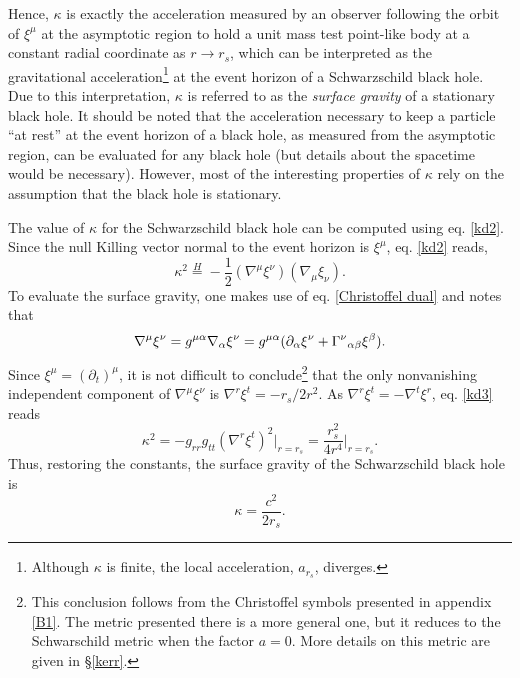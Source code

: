 \documentclass[
12pt,		%
openright,	%
twoside,  %
a4paper,			%
chapter=TITLE,		%
english,			%
french,				%
spanish,			%
brazil				%
]{USPSC-classe/USPSC}
\begin{document}
Hence, $\kappa$ is exactly the acceleration measured by an observer following the orbit of $\xi^{\mu}$ at the asymptotic region to hold a unit mass test point-like body at a constant radial coordinate as $r\to r_s$, which can be interpreted as the gravitational acceleration\footnote{Although $\kappa$ is finite, the local acceleration, $a_{r_s}$, diverges.} at the event horizon of a Schwarzschild black hole. Due to this interpretation, $\kappa$ is referred to as the \textit{surface gravity} of a stationary black hole. It should be noted that the acceleration necessary to keep a particle “at rest” at the event horizon of a black hole, as measured from the asymptotic region, can be evaluated for any black hole (but details about the spacetime would be necessary). However, most of the interesting properties of $\kappa$ rely on the assumption that the black hole is stationary. 

The value of $\kappa$ for the Schwarzschild black hole can be computed using eq. \ref{kd2}. Since the null Killing vector normal to the event horizon is $\xi^{\mu}$, eq. \ref{kd2} reads,
\begin{equation}\label{kd3}
    \kappa^2\overset{H}{=}-\frac{1}{2}(\nabla^{\mu}\xi^{\nu})(\nabla_{\mu}\xi_{\nu}).
\end{equation}
To evaluate the surface gravity, one makes use of eq. \ref{Christoffel dual} and notes that
\begin{equation}
    \nabla^{\mu}\xi^{\nu}=g^{\mu\alpha}\nabla_{\alpha}\xi^{\nu}=g^{\mu\alpha}(\partial_{\alpha}\xi^{\nu}+\Gamma^{\nu}\mathstrut_{\alpha\beta}\xi^{\beta}).
\end{equation}
Since $\xi^{\mu}=(\partial_t)^{\mu}$, it is not difficult to conclude\footnote{This conclusion follows from the Christoffel symbols presented in appendix \ref{B1}. The metric presented there is a more general one, but it reduces to the Schwarschild metric when the factor $a=0$. More details on this metric are given in \S\;\ref{kerr}.} that the only nonvanishing independent component of $\nabla^{\mu}\xi^{\nu}$ is $\nabla^{r}\xi^{t}=-r_s/2r^2$. As $\nabla^{r}\xi^{t}=-\nabla^{t}\xi^{r}$, eq. \ref{kd3} reads
\begin{equation}
    \kappa^2=-g_{rr}g_{tt}(\nabla^{r}\xi^{t})^2\Big|_{r=r_s}=\frac{r_s^2}{4r^4}\Big|_{r=r_s}.
\end{equation}
Thus, restoring the constants, the surface gravity of the Schwarzschild black hole is 
\begin{equation}\label{ksch}
    \kappa=\frac{c^2}{2r_s}.
\end{equation}
\end{document}
